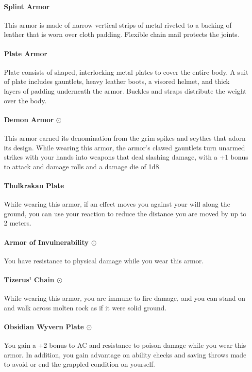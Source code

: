     \paragraph{Splint Armor}
        This armor is made of narrow vertical strips of metal riveted to a backing of leather that is worn over cloth padding.
        Flexible chain mail protects the joints.
    \paragraph{Plate Armor}
        Plate consists of shaped, interlocking metal plates to cover the entire body.
        A suit of plate includes gauntlets, heavy leather boots, a visored helmet, and thick layers of padding underneath the armor.
        Buckles and straps distribute the weight over the body.
    \paragraph{Demon Armor $\odot$}
        This armor earned its denomination from the grim spikes and scythes that adorn its design.
        While wearing this armor, the armor's clawed gauntlets turn unarmed strikes with your hands into weapons that deal slashing damage, with a +1 bonus to attack and damage rolls and a damage die of 1d8.
    \paragraph{Thulkrakan Plate}
        While wearing this armor, if an effect moves you against your will along the ground, you can use your reaction to reduce the distance you are moved by up to 2 meters.
    \paragraph{Armor of Invulnerability $\odot$}
        You have resistance to physical damage while you wear this armor.
    \paragraph{Tizerus' Chain $\odot$}
        While wearing this armor, you are immune to fire damage, and you can stand on and walk across molten rock as if it were solid ground.
    \paragraph{Obsidian Wyvern Plate $\odot$}
        You gain a +2 bonus to AC and resistance to poison damage while you wear this armor.
        In addition, you gain advantage on ability checks and saving throws made to avoid or end the grappled condition on yourself.
\newpage
